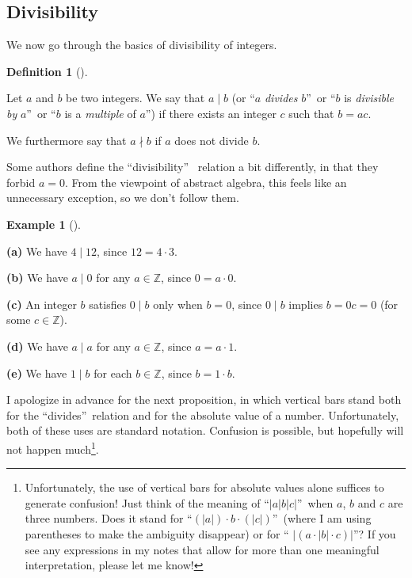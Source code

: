 \documentclass[numbers=enddot,12pt,final,onecolumn,notitlepage]{scrartcl}%
\numberwithin{exer}{subsection}
\theoremstyle{definition}
\newtheorem{defi}[theo]{Definition}
\newenvironment{definition}[1][]
{\begin{defi}[#1]\begin{leftbar}}
{\end{leftbar}\end{defi}}
\newtheorem{exam}[theo]{Example}
\newenvironment{example}[1][]
{\begin{exam}[#1]\begin{leftbar}}
{\end{leftbar}\end{exam}}
\begin{document}
\subsection{Divisibility}

We now go through the basics of divisibility of integers.

\begin{definition}
\label{def.ent.div.div}Let $a$ and $b$ be two integers. We say that $a\mid b$
(or \textquotedblleft$a$ \textit{divides} $b$\textquotedblright\ or
\textquotedblleft$b$ is \textit{divisible by }$a$\textquotedblright\ or
\textquotedblleft$b$ is a \textit{multiple} of $a$\textquotedblright) if there
exists an integer $c$ such that $b=ac$.

We furthermore say that $a\nmid b$ if $a$ does not divide $b$.
\end{definition}

Some authors define the \textquotedblleft divisibility\textquotedblright%
\ relation a bit differently, in that they forbid $a=0$. From the viewpoint of
abstract algebra, this feels like an unnecessary exception, so we don't follow them.

\begin{example}
\label{exa.ent.div.triv}\textbf{(a)} We have $4\mid12$, since $12=4\cdot3$.

\textbf{(b)} We have $a\mid0$ for any $a\in\mathbb{Z}$, since $0=a\cdot0$.

\textbf{(c)} An integer $b$ satisfies $0\mid b$ only when $b=0$, since $0\mid
b$ implies $b=0c=0$ (for some $c\in\mathbb{Z}$).

\textbf{(d)} We have $a\mid a$ for any $a\in\mathbb{Z}$, since $a=a\cdot1$.

\textbf{(e)} We have $1\mid b$ for each $b\in\mathbb{Z}$, since $b=1\cdot b$.
\end{example}

I apologize in advance for the next proposition, in which vertical bars stand
both for the \textquotedblleft divides\textquotedblright\ relation and for the
absolute value of a number. Unfortunately, both of these uses are standard
notation. Confusion is possible, but hopefully will not happen
much\footnote{Unfortunately, the use of vertical bars for absolute values
alone suffices to generate confusion! Just think of the meaning of
\textquotedblleft$\left\vert a\right\vert b\left\vert c\right\vert
$\textquotedblright\ when $a$, $b$ and $c$ are three numbers. Does it stand
for \textquotedblleft$\left(  \left\vert a\right\vert \right)  \cdot
b\cdot\left(  \left\vert c\right\vert \right)  $\textquotedblright\ (where I
am using parentheses to make the ambiguity disappear) or for \textquotedblleft%
$\left\vert \left(  a\cdot\left\vert b\right\vert \cdot c\right)  \right\vert
$\textquotedblright? If you see any expressions in my notes that allow for
more than one meaningful interpretation, please let me know!}.
\end{document}
